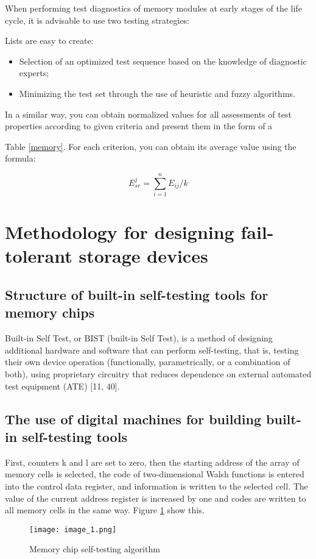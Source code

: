 \documentclass[12pt]{article}
\begin{document}
When performing test diagnostics of memory modules at early stages of the life
cycle, it is advisable to use two testing strategies:

Lists are easy to create:
\begin{itemize}
  \item Selection of an optimized test sequence based on the knowledge of diagnostic experts;
  \item Minimizing the test set through the use of heuristic and fuzzy algorithms.
\end{itemize}

In a similar way, you can obtain normalized values for all assessments of test properties according to given criteria and present them in the form of a \raggedright {Table  \ref{memory}.} For each criterion, you can obtain its average value using the formula:

\[E_{sr}^j = \sum_{i=1}^n E_{ij} / k\]
\newpage
\section{Methodology for designing fail-tolerant storage devices}
\subsection{Structure of built-in self-testing tools for memory chips}  

Built-in Self Test, or BIST (built-in Self Test), is a method of designing additional hardware and software that can perform self-testing, that is, testing their own device operation (functionally, parametrically, or a combination of both), using proprietary circuitry that reduces dependence on external automated test equipment (ATE) [11, 40].

\subsection{The use of digital machines for building built-in self-testing tools}

First, counters k and l are set to zero, then the starting address of the array of memory cells is selected, the code of two-dimensional Walsh functions is entered into the control data register, and information is written to the selected cell. The value of the current address register is increased by one and codes are written to all memory cells in the same way. Figure \ref{figure_1} show this.

\begin{figure}[h]
    \centering
    \texttt{[image: image\_1.png]}
    \caption{Memory chip self-testing algorithm}
    \label{figure_1}
\end{figure}
\end{document}
